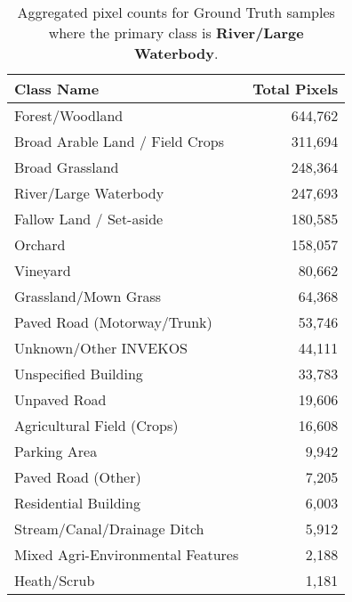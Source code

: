 \begin{table}[H] %
    \centering
    \caption{Aggregated pixel counts for Ground Truth samples where the primary class is \textbf{River/Large Waterbody}.}
    \label{tab:gt_counts_18}
    \begin{tabular}{lr}
        \hline
        \textbf{Class Name} & \textbf{Total Pixels} \\
        \hline
        Forest/Woodland & 644,762 \\
        Broad Arable Land / Field Crops & 311,694 \\
        Broad Grassland & 248,364 \\
        River/Large Waterbody & 247,693 \\
        Fallow Land / Set-aside & 180,585 \\
        Orchard & 158,057 \\
        Vineyard & 80,662 \\
        Grassland/Mown Grass & 64,368 \\
        Paved Road (Motorway/Trunk) & 53,746 \\
        Unknown/Other INVEKOS & 44,111 \\
        Unspecified Building & 33,783 \\
        Unpaved Road & 19,606 \\
        Agricultural Field (Crops) & 16,608 \\
        Parking Area & 9,942 \\
        Paved Road (Other) & 7,205 \\
        Residential Building & 6,003 \\
        Stream/Canal/Drainage Ditch & 5,912 \\
        Mixed Agri-Environmental Features & 2,188 \\
        Heath/Scrub & 1,181 \\
        \hline
    \end{tabular}
\end{table}

